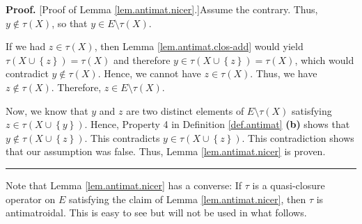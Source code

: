 \documentclass[numbers=enddot,12pt,final,onecolumn]{scrartcl}%
\theoremstyle{definition}
\newenvironment{proof}[1][Proof]{\noindent\textbf{#1.} }{\ \rule{0.5em}{0.5em}}
\begin{document}
\begin{proof}
[Proof of Lemma \ref{lem.antimat.nicer}.]Assume the contrary. Thus,
$y\notin\tau\left(  X\right)  $, so that $y\in E\setminus\tau\left(  X\right)
$.

If we had $z\in\tau\left(  X\right)  $, then Lemma \ref{lem.antimat.clos-add}
would yield $\tau\left(  X\cup\left\{  z\right\}  \right)  =\tau\left(
X\right)  $ and therefore $y\in\tau\left(  X\cup\left\{  z\right\}  \right)
=\tau\left(  X\right)  $, which would contradict $y\notin\tau\left(  X\right)
$. Hence, we cannot have $z\in\tau\left(  X\right)  $. Thus, we have
$z\notin\tau\left(  X\right)  $. Therefore, $z\in E\setminus\tau\left(
X\right)  $.

Now, we know that $y$ and $z$ are two distinct elements of $E\setminus
\tau\left(  X\right)  $ satisfying $z\in\tau\left(  X\cup\left\{  y\right\}
\right)  $. Hence, Property 4 in Definition \ref{def.antimat} \textbf{(b)}
shows that $y\notin\tau\left(  X\cup\left\{  z\right\}  \right)  $. This
contradicts $y\in\tau\left(  X\cup\left\{  z\right\}  \right)  $. This
contradiction shows that our assumption was false. Thus, Lemma
\ref{lem.antimat.nicer} is proven.
\end{proof}

Note that Lemma \ref{lem.antimat.nicer} has a converse: If $\tau$ is a
quasi-closure operator on $E$ satisfying the claim of Lemma
\ref{lem.antimat.nicer}, then $\tau$ is antimatroidal. This is easy to see but
will not be used in what follows.
\end{document}
